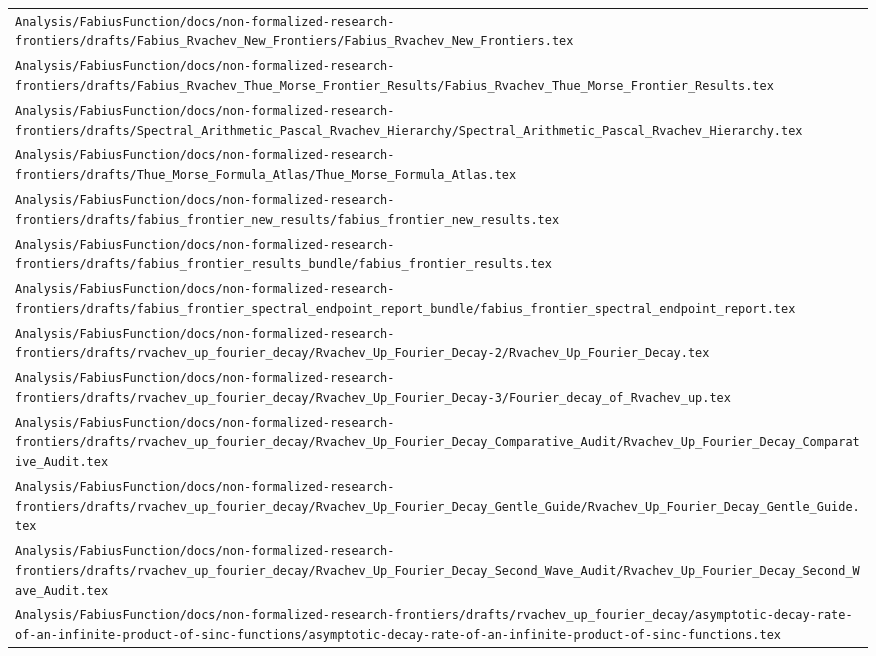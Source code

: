 \begin{longtable}{@{}p{\textwidth}@{}}
\nolinkurl{Analysis/FabiusFunction/docs/non-formalized-research-frontiers/drafts/Fabius_Rvachev_New_Frontiers/Fabius_Rvachev_New_Frontiers.tex}\\[0.12em]
\nolinkurl{Analysis/FabiusFunction/docs/non-formalized-research-frontiers/drafts/Fabius_Rvachev_Thue_Morse_Frontier_Results/Fabius_Rvachev_Thue_Morse_Frontier_Results.tex}\\[0.12em]
\nolinkurl{Analysis/FabiusFunction/docs/non-formalized-research-frontiers/drafts/Spectral_Arithmetic_Pascal_Rvachev_Hierarchy/Spectral_Arithmetic_Pascal_Rvachev_Hierarchy.tex}\\[0.12em]
\nolinkurl{Analysis/FabiusFunction/docs/non-formalized-research-frontiers/drafts/Thue_Morse_Formula_Atlas/Thue_Morse_Formula_Atlas.tex}\\[0.12em]
\nolinkurl{Analysis/FabiusFunction/docs/non-formalized-research-frontiers/drafts/fabius_frontier_new_results/fabius_frontier_new_results.tex}\\[0.12em]
\nolinkurl{Analysis/FabiusFunction/docs/non-formalized-research-frontiers/drafts/fabius_frontier_results_bundle/fabius_frontier_results.tex}\\[0.12em]
\nolinkurl{Analysis/FabiusFunction/docs/non-formalized-research-frontiers/drafts/fabius_frontier_spectral_endpoint_report_bundle/fabius_frontier_spectral_endpoint_report.tex}\\[0.12em]
\nolinkurl{Analysis/FabiusFunction/docs/non-formalized-research-frontiers/drafts/rvachev_up_fourier_decay/Rvachev_Up_Fourier_Decay-2/Rvachev_Up_Fourier_Decay.tex}\\[0.12em]
\nolinkurl{Analysis/FabiusFunction/docs/non-formalized-research-frontiers/drafts/rvachev_up_fourier_decay/Rvachev_Up_Fourier_Decay-3/Fourier_decay_of_Rvachev_up.tex}\\[0.12em]
\nolinkurl{Analysis/FabiusFunction/docs/non-formalized-research-frontiers/drafts/rvachev_up_fourier_decay/Rvachev_Up_Fourier_Decay_Comparative_Audit/Rvachev_Up_Fourier_Decay_Comparative_Audit.tex}\\[0.12em]
\nolinkurl{Analysis/FabiusFunction/docs/non-formalized-research-frontiers/drafts/rvachev_up_fourier_decay/Rvachev_Up_Fourier_Decay_Gentle_Guide/Rvachev_Up_Fourier_Decay_Gentle_Guide.tex}\\[0.12em]
\nolinkurl{Analysis/FabiusFunction/docs/non-formalized-research-frontiers/drafts/rvachev_up_fourier_decay/Rvachev_Up_Fourier_Decay_Second_Wave_Audit/Rvachev_Up_Fourier_Decay_Second_Wave_Audit.tex}\\[0.12em]
\nolinkurl{Analysis/FabiusFunction/docs/non-formalized-research-frontiers/drafts/rvachev_up_fourier_decay/asymptotic-decay-rate-of-an-infinite-product-of-sinc-functions/asymptotic-decay-rate-of-an-infinite-product-of-sinc-functions.tex}\\[0.12em]

\end{longtable}
